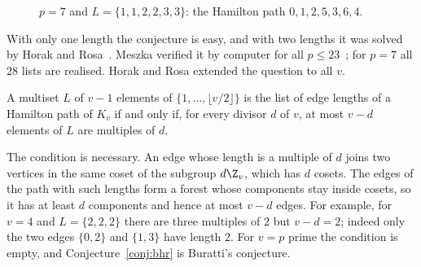 \begin{figure}[ht]
\centering

\caption{$p=7$ and $L=\{1,1,2,2,3,3\}$: the Hamilton path $0,1,2,5,3,6,4$.}
\label{fig:buratti}
\end{figure}

With only one length the conjecture is easy, and with two lengths it was solved by Horak and Rosa~\cite{hr09}. Meszka verified it by computer for all $p\leq23$~\cite[\S1]{hr09}; for $p=7$ all $28$ lists are realised. Horak and Rosa extended the question to all $v$.

\begin{conjecture}\label{conj:bhr}
A multiset $L$ of $v-1$ elements of $\{1,\dots,\lfloor v/2\rfloor\}$ is the list of edge lengths of a Hamilton path of $K_v$ if and only if, for every divisor $d$ of $v$, at most $v-d$ elements of $L$ are multiples of $d$.
\end{conjecture}

The condition is necessary. An edge whose length is a multiple of $d$ joins two vertices in the same coset of the subgroup $d\Z_v$, which has $d$ cosets. The edges of the path with such lengths form a forest whose components stay inside cosets, so it has at least $d$ components and hence at most $v-d$ edges. For example, for $v=4$ and $L=\{2,2,2\}$ there are three multiples of $2$ but $v-d=2$; indeed only the two edges $\{0,2\}$ and $\{1,3\}$ have length $2$. For $v=p$ prime the condition is empty, and Conjecture~\ref{conj:bhr} is Buratti's conjecture.
